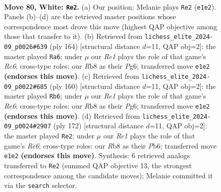 \documentclass[11pt]{article}
\begin{document}
\clearpage

\begin{figure}[p]\centering
\begin{subfigure}{0.46\textwidth}\centering
\resizebox{\linewidth}{!}{%
\newchessgame
\chessboard[
  setfen={1R6/3k3r/8/3b4/1P6/2K5/8/4R3 w - - 33 80},
  showmover=false,
  pgfstyle=straightmove, color=movearrow, markmove={e1-e2}
]}
\caption{}
\end{subfigure}\hfill
\begin{subfigure}{0.46\textwidth}\centering
\resizebox{\linewidth}{!}{%
\newchessgame
\chessboard[
  setfen={3r3k/8/2R3PK/8/8/8/8/8 w - - 17 83},
  showmover=false,
  pgfstyle=straightmove, color=movearrow, markmove={c6-a6}
]}
\caption{}
\end{subfigure}
\\[4pt]
\begin{subfigure}{0.46\textwidth}\centering
\resizebox{\linewidth}{!}{%
\newchessgame
\chessboard[
  setfen={3r3k/8/4R1PK/8/8/8/8/8 w - - 17 81},
  showmover=false,
  pgfstyle=straightmove, color=movearrow, markmove={e6-b6}
]}
\caption{}
\end{subfigure}\hfill
\begin{subfigure}{0.46\textwidth}\centering
\resizebox{\linewidth}{!}{%
\newchessgame
\chessboard[
  setfen={k5r1/8/KP2R3/8/8/8/8/8 w - - 39 87},
  showmover=false,
  pgfstyle=straightmove, color=movearrow, markmove={e6-e2}
]}
\caption{}
\end{subfigure}
\caption{\textbf{Move 80, White: \texttt{Re2}.} (a) Our position; Melanie plays \texttt{Re2} (\texttt{e1e2}). Panels (b)--(d) are the retrieved master positions whose correspondence most drove this move (highest QAP objective among those that transfer to it). (b) Retrieved from \texttt{lichess\_elite\_2024-09\_p0026\#639} (ply 164) [structural distance $d$=11, QAP obj=2]: the master played \texttt{Ra6}; under $\mu$ our \emph{Re1} plays the role of that game's \emph{Rc6}; cross-type roles: our \emph{R}b8 as their \emph{P}g6; transferred move \texttt{e1e2} \textbf{(endorses this move)}. (c) Retrieved from \texttt{lichess\_elite\_2024-09\_p0022\#685} (ply 160) [structural distance $d$=11, QAP obj=2]: the master played \texttt{Rb6}; under $\mu$ our \emph{Re1} plays the role of that game's \emph{Re6}; cross-type roles: our \emph{R}b8 as their \emph{P}g6; transferred move \texttt{e1e2} \textbf{(endorses this move)}. (d) Retrieved from \texttt{lichess\_elite\_2024-09\_p0024\#2907} (ply 172) [structural distance $d$=11, QAP obj=2]: the master played \texttt{Re2}; under $\mu$ our \emph{Re1} plays the role of that game's \emph{Re6}; cross-type roles: our \emph{R}b8 as their \emph{P}b6; transferred move \texttt{e1e2} \textbf{(endorses this move)}. Synthesis: 6 retrieved analogs transferred to \texttt{Re2} (summed QAP objective 13, the strongest correspondence among the candidate moves); Melanie committed it via the \texttt{search} selector.}
\label{fig:thought-m158}
\end{figure}
\end{document}
